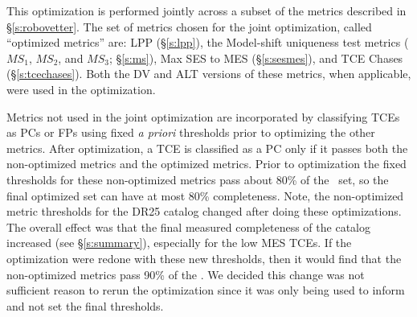 
This optimization is performed jointly across a subset of the metrics described in \S\ref{s:robovetter}.  The set of metrics chosen for the joint optimization, called ``optimized metrics'' are: LPP (\S\ref{s:lpp}), the Model-shift uniqueness test metrics ($MS_{1}$, $MS_{2}$, and $MS_{3}$; \S\ref{s:ms}), Max SES to MES (\S\ref{s:sesmes}), and TCE Chases (\S\ref{s:tcechases}). Both the DV and ALT versions of these metrics, when applicable, were used in the optimization.


Metrics not used in the joint optimization are incorporated by classifying TCEs as PCs or FPs using fixed {\it a priori} thresholds prior to optimizing the other metrics.  After optimization, a TCE is classified as a PC only if it passes both the non-optimized metrics and the optimized metrics.  Prior to optimization the fixed thresholds for these non-optimized metrics pass about 80\% of the \injtce\ set, so the final optimized set can have at most 80\% completeness. Note, the non-optimized metric thresholds for the DR25 catalog changed after doing these optimizations. The overall effect was that the final measured completeness of the catalog increased (see \S\ref{s:summary}), especially for the low MES TCEs.  If the optimization were redone with these new thresholds, then it would find that the non-optimized metrics pass 90\% of the .  We decided this change was not sufficient reason to rerun the optimization since it was only being used to inform and not set the final thresholds.

